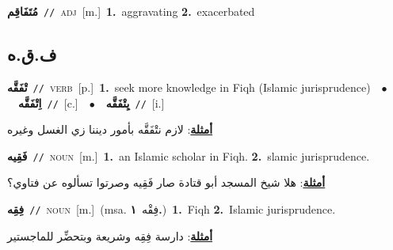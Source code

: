 \documentclass[10pt,a4paper,twoside]{article} %
\begin{document}
\begin{multicols}{2}
{\setlength\topsep{0pt}\textbf{\foreignlanguage{arabic}{مُتَفَاقِم}}\ {\color{gray}\texttt{//}\color{black}}\ \textsc{adj}\ [m.]\ \textbf{1.}~aggravating  \textbf{2.}~exacerbated\ } \vspace{2mm}

\vspace{-3mm}
\subsection*{\color{blue}\foreignlanguage{arabic}{ف.ق.ه}\color{blue}{}} 

{\setlength\topsep{0pt}\textbf{\foreignlanguage{arabic}{تْفَقَّه}}\ {\color{gray}\texttt{//}\color{black}}\ \textsc{verb}\ [p.]\ \textbf{1.}~seek more knowledge in Fiqh (Islamic jurisprudence)\ \ $\bullet$\ \ \setlength\topsep{0pt}\textbf{\foreignlanguage{arabic}{اِتْفَقَّه}}\ {\color{gray}\texttt{//}\color{black}}\ [c.]\ \ $\bullet$\ \ \setlength\topsep{0pt}\textbf{\foreignlanguage{arabic}{يِتْفَقَّه}}\ {\color{gray}\texttt{//}\color{black}}\ [i.]\  \begin{flushright}\color{gray}\foreignlanguage{arabic}{\textbf{\underline{\foreignlanguage{arabic}{أمثلة}}}: لازم نتْفَقَّه بأمور ديننا زي الغسل وغيره}\end{flushright}\color{black}} \vspace{2mm}

{\setlength\topsep{0pt}\textbf{\foreignlanguage{arabic}{فَقِيه}}\ {\color{gray}\texttt{//}\color{black}}\ \textsc{noun}\ [m.]\ \textbf{1.}~an Islamic scholar in Fiqh.  \textbf{2.}~slamic jurisprudence.\  \begin{flushright}\color{gray}\foreignlanguage{arabic}{\textbf{\underline{\foreignlanguage{arabic}{أمثلة}}}: هلا شيخ المسجد أبو قتادة صار فَقِيه وصرتوا تسألوه عن فتاوي؟}\end{flushright}\color{black}} \vspace{2mm}

{\setlength\topsep{0pt}\textbf{\foreignlanguage{arabic}{فِقِه}}\ {\color{gray}\texttt{//}\color{black}}\ \textsc{noun}\ [m.]\ \color{gray}(msa. \foreignlanguage{arabic}{فِقْه}~\foreignlanguage{arabic}{\textbf{١.}})\color{black}\ \textbf{1.}~Fiqh  \textbf{2.}~Islamic jurisprudence.\  \begin{flushright}\color{gray}\foreignlanguage{arabic}{\textbf{\underline{\foreignlanguage{arabic}{أمثلة}}}: دارسة فِقِه وشريعة وبتحضِّر للماجستير}\end{flushright}\color{black}} \vspace{2mm}


\end{multicols}
\end{document}
